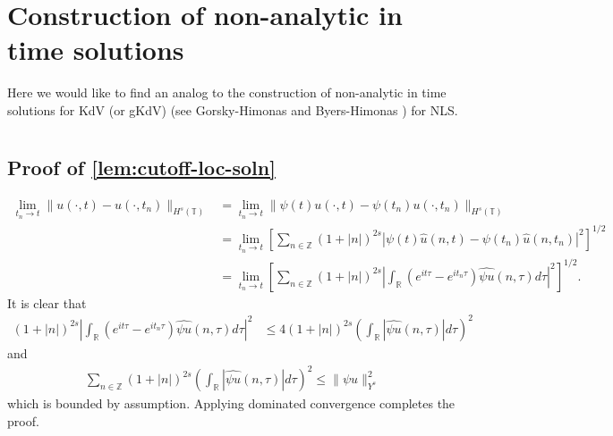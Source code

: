 \documentclass[12pt,reqno]{amsart}
\numberwithin{equation}{section}  %
\numberwithin{figure}{section}
\newcommand{\rr}{\mathbb{R}}
\newcommand{\zz}{\mathbb{Z}}
\newcommand{\ci}{\mathbb{T}}
\newcommand{\wh}{\widehat}
\theoremstyle{plain}
\theoremstyle{definition}
\theoremstyle{remark}
\begin{document}
%
\section{Construction of non-analytic in time solutions} 
\label{g2-rreg}
%
%
Here we would like to find an analog to the construction
 of non-analytic in time solutions for KdV (or gKdV)
 (see  Gorsky-Himonas \cite{Gorsky:2005fk} and Byers-Himonas
 \cite{Byers-2006-Existence-time-for-the-Camassa-Holm})
 for NLS. 
 
 








%
%
%
%
%
%
%
%
%





%
\appendix
\section{}
\subsection{Proof of \autoref{lem:cutoff-loc-soln}}
%
%
\begin{equation*}
  \begin{split}
    \lim_{t_{n} \to t} \|u(\cdot, t) - u(\cdot, t_{n})\|_{H^s(\ci)} 
    & = \lim_{t_{n} \to t} \|\psi(t) u(\cdot, t) - \psi(t_n) u(\cdot, t_{n})\|_{H^s(\ci)} 
    \\
    & = \lim_{t_n \to t} \left[ \sum_{n \in \zz}\left( 1 + | n |
    \right)^{2s} | \psi(t)  \wh{u}(n, t) - \psi(t_n) \wh{ u}(n, t_n) |^2 \right]^{1/2}
    \\
    & = \lim_{t_n \to t} \left[ \sum_{n \in \zz} \left( 1 + | n |
    \right)^{2s} | \int_{\rr} (e^{it \tau} - e^{it_{n} \tau}) \wh{\psi u}(n,
    \tau) d \tau |^2 \right]^{1/2}.
  \end{split}
\end{equation*}
    It is clear that
    \begin{equation*}
      \begin{split}
        \left( 1 + | n |
        \right)^{2s} | \int_{\rr} (e^{it \tau} - e^{it_{n}\tau}) \wh{\psi u}(n, \tau) d \tau |^2 
    & \le 4  \left( 1 + | n |
    \right)^{2s} \left ( \int_{\rr} |\wh{\psi u}(n, \tau)| d \tau
    \right )^2 
  \end{split}
\end{equation*}
and 
%
%
\begin{equation*}
  \begin{split}
 \sum_{n \in \zz} \left( 1 + | n |
    \right)^{2s} \left ( \int_{\rr} |\wh{\psi u}(n, \tau)| d \tau
    \right ) ^2 
    \le \|\psi u \|_{Y^s}^2 
  \end{split}
\end{equation*}
which is bounded by assumption.
Applying dominated convergence completes the proof. \qquad \qedsymbol
%
%
\end{document}
